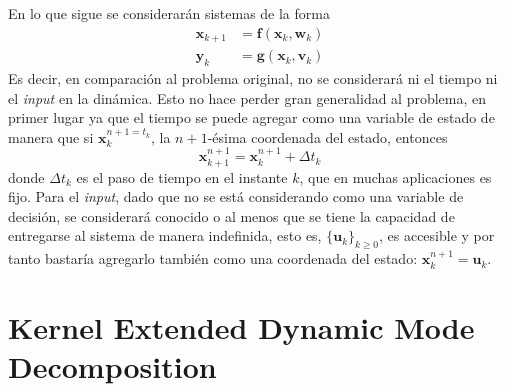 En lo que sigue se considerarán sistemas de la forma
\begin{align*}
	\mathbf{x}_{k+1} &= \mathbf{f}( \mathbf{x}_k, \mathbf{w}_k) \\
	\mathbf{y}_k &= \mathbf{g}(\mathbf{x}_k, \mathbf{v}_k)
\end{align*}
Es decir, en comparación al problema original, no se considerará ni el tiempo ni el \textit{input} en la dinámica. Esto no hace perder gran generalidad al problema, en primer lugar ya que el tiempo se puede agregar como una variable de estado de manera que si $\mathbf{x}_{k}^{n+1 = t_k}$, la $n+1$-ésima coordenada del estado, entonces 
\begin{equation*}
    \mathbf{x}_{k+1}^{n+1} = \mathbf{x}_{k}^{n+1} + \Delta t_k
\end{equation*}
donde $\Delta t_k$ es el paso de tiempo en el instante $k$, que en muchas aplicaciones es fijo. Para el \textit{input}, dado que no se está considerando como una variable de decisión, se considerará conocido o al menos que se tiene la capacidad de entregarse al sistema de manera indefinida, esto es, $\{ \mathbf{u}_k \}_{k \geq 0}$, es accesible y por tanto bastaría agregarlo también como una coordenada del estado: $\mathbf{x}_{k}^{n+1} = \mathbf{u}_k$.
\section{Kernel Extended Dynamic Mode Decomposition}

